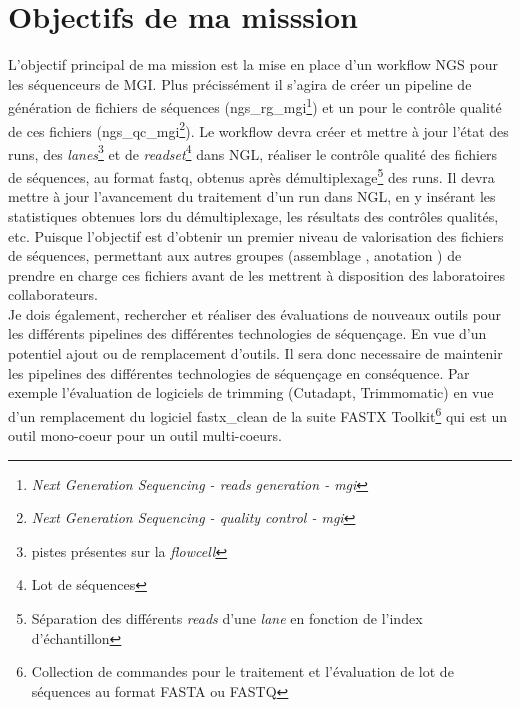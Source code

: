\section{Objectifs de ma misssion}
L'objectif principal de ma mission est la mise en place d'un workflow NGS pour les séquenceurs de MGI. Plus précissément il s'agira de créer un pipeline de génération de fichiers de séquences (ngs\_rg\_mgi\footnote{\emph{Next Generation Sequencing - reads generation - mgi}}) et un pour le contrôle qualité de ces fichiers (ngs\_qc\_mgi\footnote{\emph{Next Generation Sequencing - quality control - mgi}}). Le workflow devra créer et mettre à jour l'état des runs, des \emph{lanes}\footnote{pistes présentes sur la \emph{flowcell}} et de \emph{readset}\footnote{Lot de séquences} dans NGL, réaliser le contrôle qualité des fichiers de séquences, au format fastq, obtenus après démultiplexage\footnote{Séparation des différents \emph{reads} d'une \emph{lane} en fonction de l'index d'échantillon} des runs. Il devra mettre à jour l'avancement du traitement d'un run dans NGL, en y insérant les statistiques obtenues lors du démultiplexage, les résultats des contrôles qualités, etc. Puisque l'objectif est d'obtenir un premier niveau de valorisation des fichiers de séquences, permettant aux autres groupes (\og assemblage \fg{}, \og anotation \fg{}) de prendre en charge ces fichiers avant de les mettrent à disposition des laboratoires collaborateurs.\\

Je dois également, rechercher et réaliser des évaluations de nouveaux outils pour les différents pipelines des différentes technologies de séquençage. En vue d'un potentiel ajout ou de remplacement d'outils. Il sera donc necessaire de maintenir les pipelines des différentes technologies de séquençage en conséquence. Par exemple l'évaluation de logiciels de trimming (Cutadapt, Trimmomatic) en vue d'un remplacement du logiciel fastx_clean de la suite FASTX Toolkit\footnote{Collection de commandes pour le traitement et l'évaluation de lot de séquences au format FASTA ou FASTQ} qui est un outil mono-coeur pour un outil multi-coeurs.